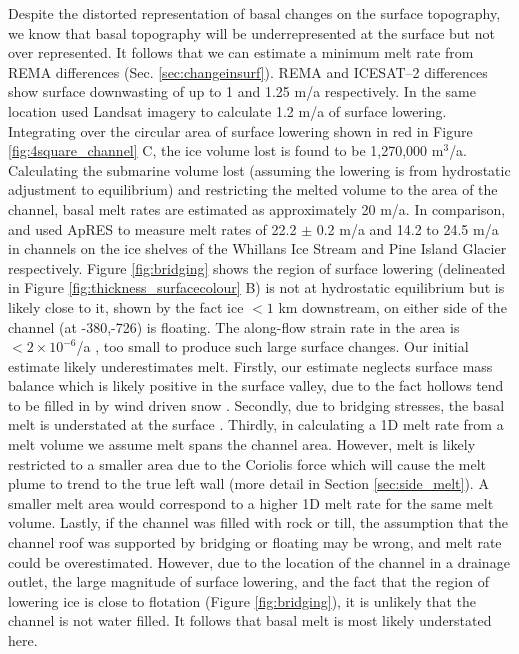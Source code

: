 Despite the distorted representation of basal changes on the surface topography, we know that basal topography will be underrepresented at the surface but not over represented. It follows that we can estimate a minimum melt rate from REMA differences (Sec. \ref{sec:changeinsurf}). REMA and ICESAT--2 differences show surface downwasting of up to 1 and 1.25 m/a respectively. In the same location \cite{kim2016active} used Landsat imagery to calculate 1.2 m/a of surface lowering.
Integrating over the circular area of surface lowering shown in red in Figure \ref{fig:4square_channel} C, the ice volume lost is found to be 1,270,000 $\mathrm{m}^3$/a. Calculating the submarine volume lost (assuming the lowering is from hydrostatic adjustment to equilibrium) and restricting the melted volume to the area of the channel, basal melt rates are estimated as approximately 20 m/a. In comparison, \cite{marsh2016high} and \cite{stanton2013channelized} used ApRES to measure melt rates of 22.2 $\pm$ 0.2 m/a and 14.2 to 24.5 m/a in channels on the ice shelves of the Whillans Ice Stream and Pine Island Glacier respectively. 
Figure \ref{fig:bridging} shows the region of surface lowering (delineated in Figure \ref{fig:thickness_surfacecolour} B) is not at hydrostatic equilibrium but is likely close to it, shown by the fact ice $<1$ km downstream, on either side of the channel (at -380,-726) is floating. 
The along-flow strain rate in the area is $< 2 \times 10 ^{-6}$/a \citep{alley2018continent}, too small to produce such large surface changes. 
Our initial estimate likely underestimates melt. Firstly, our estimate neglects surface mass balance which is likely positive in the surface valley, due to the fact hollows tend to be filled in by wind driven snow \citep[e.g.][]{gow1965relationship}. Secondly, due to bridging stresses, the basal melt is understated at the surface \citep{drews2015evolution}.  Thirdly, in calculating a 1D melt rate from a melt volume we assume melt spans the channel area. However, melt is likely restricted to a smaller area due to the Coriolis force which will cause the melt plume to trend to the true left wall (more detail in Section \ref{sec:side_melt}). A smaller melt area would correspond to a higher 1D melt rate for the same melt volume.  
Lastly, if the channel was filled with rock or till, the assumption that the channel roof was supported by bridging or floating may be wrong, and melt rate could be overestimated. However, due to the location of the channel in a drainage outlet, the large magnitude of surface lowering, and the fact that the region of lowering ice is close to flotation (Figure \ref{fig:bridging}), it is unlikely that the channel is not water filled. It follows that basal melt is most likely understated here.


